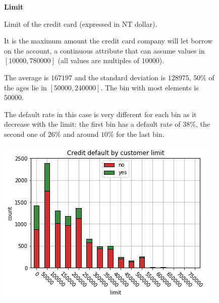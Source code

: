 \begin{figure}[h]
  \begin{minipage}[h]{.50\textwidth}
        {\Large \textbf{Limit}}
        
        Limit of the credit card (expressed in NT dollar).
        
        It is the maximum amount the credit card company will let borrow on the account, 
        a continuous attribute that can assume values in $[10000, 780000]$ (all values are multiples of $10000$).
        
        The average is $167197$ and the standard deviation is $128975$, $50\%$ of the ages lie in $[50000, 240000]$. The bin with most elements is $50000$.
        
        The default rate in this case is very different for each bin as it decrease with the limit: the first bin has a default rate of $38\%$, the second one of $26\%$ and around $10\%$ for the last bin.
        
  \end{minipage}
  \begin{minipage}[h]{.45\textwidth}
    \includegraphics[width=.95\textwidth]{img/ch2/limit}
  \end{minipage}

\end{figure}


